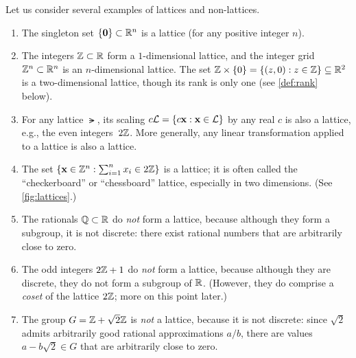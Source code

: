\documentclass[11pt]{article}
\begin{document}
\begin{example}
  \label{ex:lattices}
  Let us consider several examples of lattices and non-lattices.
  \begin{enumerate}[itemsep=0pt]
  \item The singleton set $\{\mathbf{0}\} \subset \mathbb{R}^{n}$ is a lattice
    (for any positive integer $n$).
  \item The integers $\mathbb{Z} \subset \mathbb{R}$ form a $1$-dimensional lattice,
    and the integer grid $\mathbb{Z}^{n} \subset \mathbb{R}^{n}$ is an $n$-dimensional
    lattice.  The set $\mathbb{Z} \times \{0\} = \{(z,0) : z \in \mathbb{Z}\}
    \subseteq \mathbb{R}^{2}$ is a two-dimensional lattice, though its rank is
    only one (see \cref{def:rank} below).
  \item For any lattice $\lat$, its scaling $c \mathcal{L} = \{c \mathbf{x} :
      \mathbf{x} \in \mathcal{L}\}$ by any real $c$ is also a lattice, e.g., the
    even integers~$2\mathbb{Z}$. More generally, any linear transformation
    applied to a lattice is also a lattice.
  \item The set $\{\mathbf{x} \in \mathbb{Z}^{n} : \sum_{i=1}^{n} x_{i} \in
      2\mathbb{Z}\}$ is a lattice; it is often called the ``checkerboard'' or
    ``chessboard'' lattice, especially in two dimensions.  (See
    \cref{fig:lattices}.)
  \item The rationals $\mathbb{Q} \subset \mathbb{R}$ do \emph{not} form a lattice,
    because although they form a subgroup, it is not discrete: there
    exist rational numbers that are arbitrarily close to zero.
  \item The odd integers $2\mathbb{Z}+1$ do \emph{not} form a lattice, because
    although they are discrete, they do not form a subgroup of $\mathbb{R}$.
    (However, they do comprise a \emph{coset} of the lattice $2\mathbb{Z}$;
    more on this point later.)
  \item The group $G=\mathbb{Z} + \sqrt{2}\mathbb{Z}$ is \emph{not} a lattice, because
    it is not discrete: since $\sqrt{2}$ admits arbitrarily good
    rational approximations $a/b$, there are values $a-b\sqrt{2} \in
    G$ that are arbitrarily close to zero.
  \end{enumerate}
\end{example}
\end{document}

